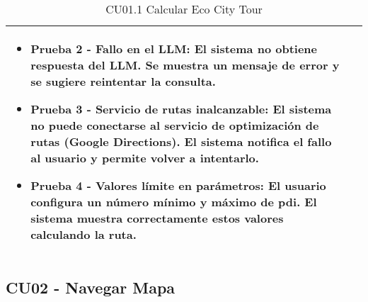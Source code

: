 \begin{table}[H]
\begin{tabularx}{\linewidth}{ p{} p{} }
\begin{itemize}
			\vspace{2pt}
			\item \textbf{Prueba 2 - Fallo en el LLM:} El sistema no obtiene respuesta del LLM. Se muestra un mensaje de error y se sugiere reintentar la consulta.
			\vspace{2pt}
			\item \textbf{Prueba 3 - Servicio de rutas inalcanzable:} El sistema no puede conectarse al servicio de optimización de rutas (Google Directions). El sistema notifica el fallo al usuario y permite volver a intentarlo.
			\vspace{2pt}
			\item \textbf{Prueba 4 - Valores límite en parámetros:} El usuario configura un número mínimo y máximo de \acrshort{pdi}. El sistema muestra correctamente estos valores calculando la ruta.
		\end{itemize} \\
		\bottomrule
	\end{tabularx}
	\caption{CU01.1 Calcular Eco City Tour}
	\label{cu:calcular-tour}
\end{table}


\subsection{CU02 - Navegar Mapa}


